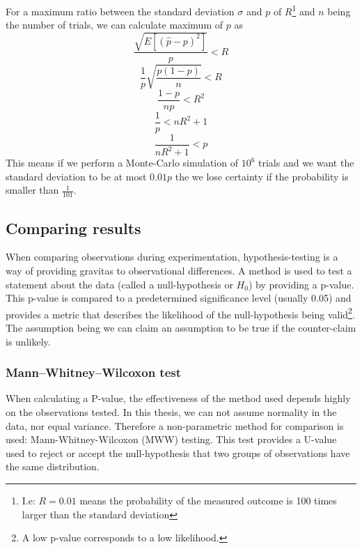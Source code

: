 For a maximum ratio between the standard deviation \(\sigma\) and \(p\) of \(R\)\footnote{I.e: \(R=0.01\) means the probability of the measured outcome is 100 times larger than the standard deviation} and \(n\) being the number of trials, we can calculate maximum of \(p\) as
\begin{equation*}
    \frac{\sqrt{E[(\hat{p}-p)^{2}]}}{p} < R
\end{equation*}
\begin{equation*}
    \frac{1}{p}\sqrt{\frac{p(1-p)}{n}} < R
\end{equation*}
\begin{equation*}
    \frac{1-p}{np} < R^{2}
\end{equation*}
\begin{equation*}
    \frac{1}{p}< nR^{2}+1
\end{equation*}
\begin{equation}
    \frac{1}{nR^{2}+1}<p
    \label{eq:montecarloP}
\end{equation}
This means if we perform a Monte-Carlo simulation of \(10^{6}\) trials and we want the standard deviation to be at most \(0.01p\) the we lose certainty if the probability is smaller than \(\frac{1}{101}\).

\subsection{Comparing results}
When comparing observations during experimentation, hypothesis-testing is a way of providing gravitas to observational differences. A method is used to test a statement about the data (called a null-hypothesis or \(H_{0}\)) by providing a p-value. This p-value is compared to a predetermined significance level (usually 0.05) and provides a metric that describes the likelihood of the null-hypothesis being valid\footnote{A low p-value corresponds to a low likelihood.}. The assumption being we can claim an assumption to be true if the counter-claim is unlikely.  

\subsubsection{Mann–Whitney–Wilcoxon test}
\label{background:mannwhitney}
When calculating a P-value, the effectiveness of the method used depends highly on the observations tested. In this thesis, we can not assume normality in the data, nor equal variance. Therefore a non-parametric method for comparison is used: Mann-Whitney-Wilcoxon (MWW) testing. This test provides a U-value used to reject or accept the null-hypothesis that two groups of observations have the same distribution. 

